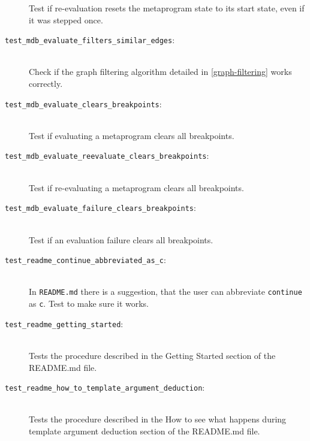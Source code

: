 \begin{description}
        Test if re-evaluation resets the metaprogram state to its start state,
        even if it was stepped once.
    \item[\texttt{test\_mdb\_evaluate\_filters\_similar\_edges}:] \hfill \\
        Check if the graph filtering algorithm detailed in
        \ref{graph-filtering} works correctly.
    \item[\texttt{test\_mdb\_evaluate\_clears\_breakpoints}:] \hfill \\
        Test if evaluating a metaprogram clears all breakpoints.
    \item[\texttt{test\_mdb\_evaluate\_reevaluate\_clears\_breakpoints}:] \hfill \\
        Test if re-evaluating a metaprogram clears all breakpoints.
    \item[\texttt{test\_mdb\_evaluate\_failure\_clears\_breakpoints}:] \hfill \\
        Test if an evaluation failure clears all breakpoints.
    \item[\texttt{test\_readme\_continue\_abbreviated\_as\_c}:] \hfill \\
        In \texttt{README.md} there is a suggestion, that the user can
        abbreviate \texttt{continue} as \texttt{c}. Test to make sure it works.
    \item[\texttt{test\_readme\_getting\_started}:] \hfill \\
        Tests the procedure described in the Getting Started section of the
        README.md file.
    \item[\texttt{test\_readme\_how\_to\_template\_argument\_deduction}:] \hfill \\
        Tests the procedure described in the How to see what happens during
        template argument deduction section of the README.md file.
\end{description}

